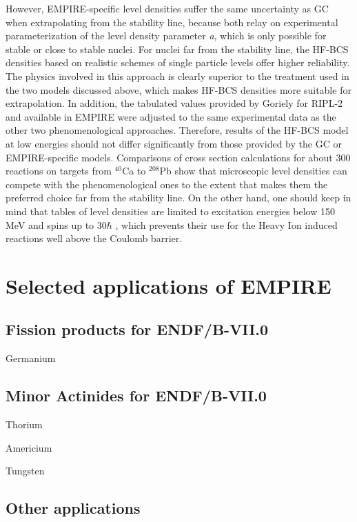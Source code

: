 However, EMPIRE-specific level densities suffer the same uncertainty as GC
when extrapolating from the stability line, because both relay on
experimental parameterization of the level density parameter \textit{a},
which is only possible for stable or close to stable nuclei. For nuclei far
from the stability line, the HF-BCS densities based on realistic schemes of
single particle levels offer higher reliability. The physics involved in
this approach is clearly superior to the treatment used in the two models
discussed above, which makes HF-BCS densities more suitable for
extrapolation. In addition, the tabulated values provided by Goriely for
RIPL-2 and available in EMPIRE were adjusted to the same experimental data
as the other two phenomenological approaches. Therefore, results of the
HF-BCS model at low energies should not differ significantly from those
provided by the GC or EMPIRE-specific models. Comparisons of cross section
calculations for about 300 reactions on targets from $^{40}$Ca to $^{208}$Pb
show that microscopic level densities can compete with the phenomenological
ones to the extent that makes them the preferred choice far from the
stability line. On the other hand, one should keep in mind that tables of
level densities are limited to excitation energies below 150 MeV and spins
up to 30$\hbar$ , which prevents their use for the Heavy Ion induced
reactions well above the Coulomb barrier.

\section{Selected applications of EMPIRE}

\subsection{Fission products for ENDF/B-VII.0}

Germanium~\cite{iwamoto2005ncs}

\subsection{Minor Actinides for ENDF/B-VII.0}

Thorium~\cite{Sin:06}

Americium~\cite{Rochman:06a}

Tungsten \cite{Capote_ND07}

\subsection{Other applications}

